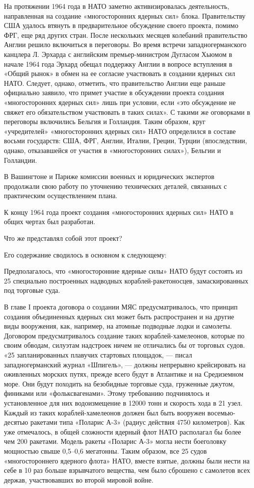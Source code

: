 \documentclass[12pt, a4paper, openany]{book}
\begin{document}
	На протяжении 1964 года в НАТО заметно активизировалась деятельность, направленная на создание «многосторонних ядерных сил» блока. Правительству США удалось втянуть в предварительное обсуждение своего проекта, помимо ФРГ, еще ряд других стран. После нескольких месяцев колебаний правительство Англии решило включиться в переговоры. Во время встречи западногерманского канцлера Л. Эрхарда с английским премьер-министром Дугласом Хьюмом в начале 1964 года Эрхард обещал поддержку Англии в вопросе вступления в «Общий рынок» в обмен на ее согласие участвовать в создании ядерных сил НАТО. Следует, однако, отметить, что правительство Англии еще раньше официально заявило, что примет участие в обсуждении проекта создания «многосторонних ядерных сил» лишь при условии, если «это обсуждение не свяжет его обязательством участвовать в таких силах». С такими же оговорками в переговоры включились Бельгия и Голландия. Таким образом, круг «учредителей» «многосторонних ядерных сил» НАТО определился в составе восьми государств: США, ФРГ, Англии, Италии, Греции, Турции (впоследствии, однако, отказавшейся от участия в «многосторонних силах»), Бельгии и Голландии.
	
	В Вашингтоне и Париже комиссии военных и юридических экспертов продолжали свою работу по уточнению технических деталей, связанных с практическим осуществлением плана.
	
	К концу 1964 года проект создания «многосторонних ядерных сил» НАТО в общих чертах был разработан.
	
	Что же представлял собой этот проект?
	
	Его содержание сводилось в основном к следующему:
	
	Предполагалось, что «многосторонние ядерные силы» НАТО будут состоять из 25 специально построенных надводных кораблей-ракетоносцев, замаскированных под торговые суда.
	
	В главе I проекта договора о создании МЯС предусматривалось, что принцип создания объединенных ядерных сил может быть распространен и на другие виды вооружения, как, например, на атомные подводные лодки и самолеты. Договором предусматривалось создание таких кораблей-хамелеонов, которые по своим обводам, силуэтам надстроек ничем не отличались бы от торговых судов. «25 запланированных плавучих стартовых площадок, — писал западногерманский журнал «Шпигель», — должны непрерывно крейсировать на оживленных морских путях, прежде всего будут в Атлантике и на Средиземном море. Они будут походить на безобидные торговые суда, груженные джутом, финиками или «фольксвагенами». Этому требованию подчинялось и установленное для них водоизмещение в 12000 тонн и скорость хода в 21 узел. Каждый из таких кораблей-хамелеонов должен был быть вооружен восемью-десятью ракетами типа «Поларис А-3» (радиус действия 4750 километров). Как уже отмечалось, в общей сложности ядерный флот НАТО располагал бы более чем 200 ракетами. Модель ракеты «Поларис А-3» могла нести боеголовку мощностью свыше 0,5–0,6 мегатонны. Таким образом, все 25 судов «многостороннего ядерного флота» НАТО, вместе взятые, должны были нести на себе в 10 раз больше взрывчатого вещества, чем было сброшено с самолетов всех держав, участвовавших во второй мировой войне.
	
\end{document}
